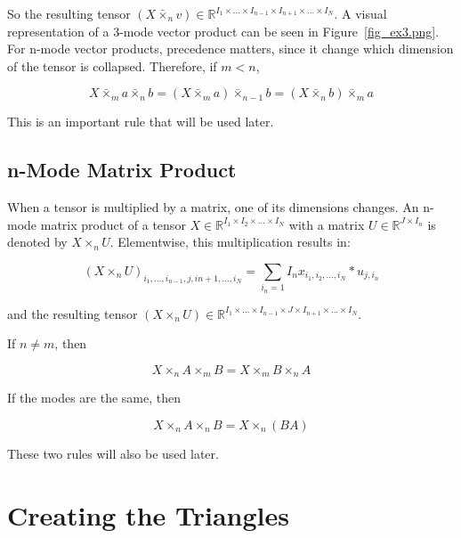 \documentclass[twocolumn,10pt]{asme2ej}
\begin{document}
So the resulting tensor $(X \bar{\times}_n v ) \in \mathbb{R}^{I_1 \times ... \times I_{n-1} \times I_{n+1} \times ... \times I_N}$. A visual representation of a 3-mode vector product can be seen in Figure~\ref{fig_ex3.png}.
For n-mode vector products, precedence matters, since it change which dimension of the tensor is collapsed. Therefore, if $m < n$,

\begin{equation}
X \bar{\times}_m a \bar{\times}_n b = (X \bar{\times}_m a) \bar{\times}_{n-1} b = (X \bar{\times}_n b) \bar{\times}_m a
\label{eq_vectorMode}
\end{equation}

This is an important rule that will be used later.

\subsection{n-Mode Matrix Product}
When a tensor is multiplied by a matrix, one of its dimensions changes. An n-mode matrix product of a tensor $X \in \mathbb{R}^{I_1 \times I_2 \times ... \times I_N}$ with a matrix $U \in \mathbb{R}^{J \times I_n}$ is denoted by $X \times_n U$. Elementwise, this multiplication results in:

\begin{equation}
(X \times_n U )_{i_1, ..., i_{n-1}, j, i{n+1}, ..., i_N} = \sum_{i_n = 1}{I_n} x_{i_1, i_2, ..., i_N}*u_{j,i_n}
\end{equation}

and the resulting tensor $(X \times_n U ) \in \mathbb{R}^{I_1 \times ... \times I_{n-1} \times J \times I_{n+1} \times ... \times I_N}$.

If $n \neq m$, then

\begin{equation}
X \times_n A \times_m  B = X \times_m B \times_n A
\label{eq_matrixModeCommute}
\end{equation}

If the modes are the same, then

\begin{equation}
X \times_n A \times_n  B = X \times_n (BA)
\label{eq_matrixModeAssociate}
\end{equation}

These two rules will also be used later.

\section{Creating the Triangles}
\end{document}
